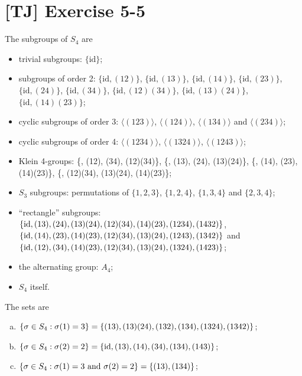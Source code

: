 \documentclass[a4paper,11pt,twocolumn]{article}
\begin{document}
  \section{[TJ] Exercise 5-5}
  The subgroups of $S_4$ are
  \begin{itemize}
    \item trivial subgroups: $\{\text{id}\}$;
    \item subgroups of order 2: $\{\text{id}, (12)\}$, $\{\text{id}, (13)\}$, $\{\text{id}, (14)\}$, $\{\text{id}, (23)\}$, $\{\text{id}, (24)\}$, $\{\text{id}, (34)\}$, $\{\text{id}, (12)(34)\}$, $\{\text{id}, (13)(24)\}$, $\{\text{id}, (14)(23)\}$;
    \item cyclic subgroups of order 3: $\langle (123) \rangle$, $\langle (124) \rangle$, $\langle (134) \rangle$ and $\langle (234) \rangle$;
    \item cyclic subgroups of order 4: $\langle (1234) \rangle$, $\langle (1324) \rangle$, $\langle (1243) \rangle$;
    \item Klein 4-groups: \{, (12), (34), (12)(34)\},
        \{, (13), (24), (13)(24)\},
        \{, (14), (23), (14)(23)\},
        \{, (12)(34), (13)(24), (14)(23)\};
    \item $S_3$ subgroups: permutations of $\{1, 2, 3\}$, $\{1, 2, 4\}$, $\{1, 3, 4\}$ and $\{2, 3, 4\}$;
    \item ``rectangle'' subgroups: $\{\text{id}, (13), (24),\\ (13)(24), (12)(34), (14)(23), (1234), (1432)\}$, $\{\text{id}, (14), (23), (14)(23), (12)(34), (13)(24), \\ (1243), (1342)\}$ and $\{\text{id}, (12), (34), (14)(23), \\ (12)(34), (13)(24), (1324), (1423)\}$;
    \item the alternating group: $A_4$;
    \item $S_4$ itself.
  \end{itemize}
  The sets are
  \begin{enumerate}[(a)]
    \item $\{\sigma \in S_4 : \sigma(1) = 3\} = \{(13), (13)(24), \\ (132), (134), (1324), (1342)\}$;
    \item $\{\sigma \in S_4 : \sigma(2) = 2\} = \{\text{id}, (13), (14), (34), \\ (134), (143)\}$;
    \item $\{\sigma \in S_4 : \sigma(1) = 3 \text{ and } \sigma(2) = 2\} =  \{(13), \\ (134)\}$;
  \end{enumerate}
\end{document}
